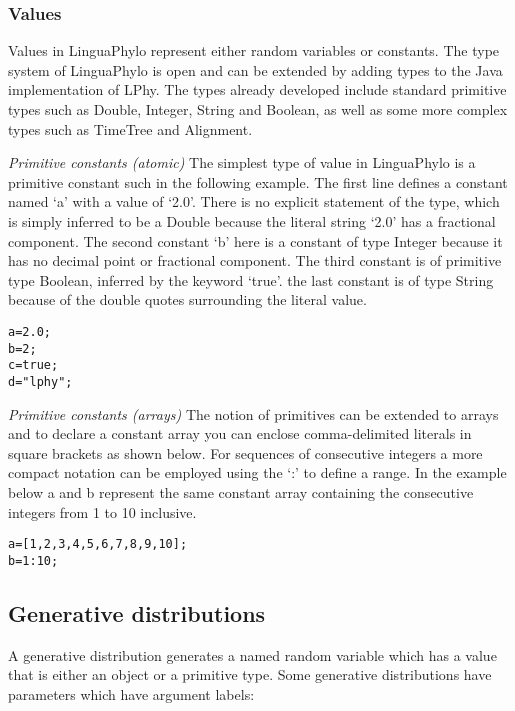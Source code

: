 \documentclass[10pt,letterpaper,table]{article}
\begin{document}
\subsubsection*{Values}

Values in LinguaPhylo represent either random variables or
constants. The type system of LinguaPhylo is open and can be extended
by adding types to the Java implementation of LPhy. The types already
developed include standard primitive types such as Double, Integer,
String and Boolean, as well as some more complex types such as
TimeTree and Alignment.\newline

\noindent \emph{Primitive constants (atomic)} The simplest type of value in LinguaPhylo is a primitive constant such in the following example. The first line defines a constant named `a' with a value of `2.0'. There is no explicit statement of the type, which is simply inferred to be a Double because the literal string `2.0' has a fractional component. The second constant `b' here is a constant of type Integer because it has no decimal point or fractional component. The third constant is of primitive type Boolean, inferred by the keyword `true'. the last constant is of type String because of the double quotes surrounding the literal value.

{\singlespacing
\begin{alltt}
  a = 2.0;
  b = 2;
  c = true;
  d = "lphy";
\end{alltt}
}

\noindent \emph{Primitive constants (arrays)} The notion of primitives can be extended to arrays and to declare a constant array you can enclose comma-delimited literals in square brackets as shown below. For sequences of consecutive integers a more compact notation can be employed using the `:' to define a range. In the example below a and b represent the same constant array containing the consecutive integers from 1 to 10 inclusive.

\begin{alltt}
  a = [1, 2, 3, 4, 5, 6, 7, 8, 9, 10];
  b = 1:10;
\end{alltt}

\subsection*{Generative distributions}

A generative distribution generates a named random variable which has a value that is either an object or a primitive type. Some generative distributions have parameters which have argument labels:
\end{document}

